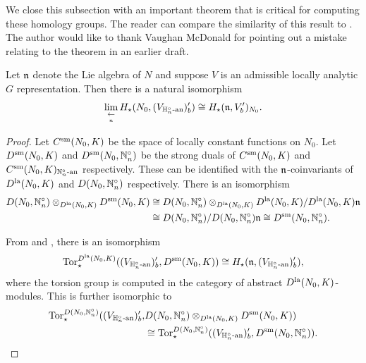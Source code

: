 \documentclass[10pt]{amsart}
\begin{document}
We close this subsection with an important theorem that is critical for computing these homology groups. The reader can compare the similarity of this result to \cite[Thm. 4.10, Thm. 7.1]{Kohlhaase}. The author would like to thank Vaughan McDonald for pointing out a mistake relating to the theorem in an earlier draft. 

\begin{theorem}\label{thm:lie_cohom}
Let $\mathfrak{n}$ denote the Lie algebra of $N$ and suppose $V$ is an admissible locally analytic $G$ representation. Then there is a natural isomorphism \begin{equation}
    \underset{\underset{n}{\leftarrow}}{\lim} \,H_{\star}(N_{0},(V_{\mathbb{H}_{n}^{\circ}\textnormal{-an}})^{\prime}_{b}) \cong H_{\star}(\mathfrak{n},V^\prime_{b})_{N_{0}}. 
\end{equation}
\end{theorem}
\begin{proof}
Let $C^{\textnormal{sm}}(N_{0},K)$ be the space of locally constant functions on $N_{0}$. Let $D^{\textnormal{sm}}(N_{0},K)$ and $D^{\textnormal{sm}}(N_{0},\mathbb{N}_{n}^{\circ})$ be the strong duals of $C^{\textnormal{sm}}(N_{0},K)$ and $C^{\textnormal{sm}}(N_{0},K)_{\mathbb{N}_{n}^{\circ}\textnormal{-an}}$ respectively. These can be identified with the $\mathfrak{n}$-coinvariants of $D^{\textnormal{la}}(N_{0},K)$ and $D(N_{0},\mathbb{N}_{n}^{\circ})$ respectively. There is an isomorphism \begin{equation*}\begin{split}
    D(N_{0},\mathbb{N}_{n}^{\circ})\otimes_{D^{\textnormal{la}}(N_{0},K)}D^{\textnormal{sm}}(N_{0},K) & \cong D(N_{0},\mathbb{N}_{n}^{\circ})\otimes_{D^{\textnormal{la}}(N_{0},K)}D^{\textnormal{la}}(N_{0},K) / D^{\textnormal{la}}(N_{0},K)\mathfrak{n} \\
    & \cong D(N_{0},\mathbb{N}_{n}^{\circ})/D(N_{0},\mathbb{N}_{n}^{\circ})\mathfrak{n} \cong D^{\textnormal{sm}}(N_{0},\mathbb{N}_{n}^{\circ}).
\end{split}
\end{equation*}

From \cite[(47)]{Kohlhaase} and \cite[pg. 306]{ST_duality}, there is an isomorphism \begin{equation}
    \textnormal{Tor}_{\star}^{D^{\textnormal{la}}(N_{0},K)}((V_{\mathbb{H}_{n}^{\circ}\textnormal{-an}})^{\prime}_{b}, D^{\textnormal{sm}}(N_{0},K)) \cong H_{\star}(\mathfrak{n},(V_{\mathbb{H}_{n}^{\circ}\textnormal{-an}})^{\prime}_{b}),
\end{equation} where the torsion group is computed in the category of abstract $D^{\textnormal{la}}(N_{0},K)$-modules. This is further isomorphic to \begin{equation}\label{eqn:tor}\begin{split}
    \textnormal{Tor}_{\star}^{D(N_{0},\mathbb{N}_{n}^{\circ})}((V_{\mathbb{H}_{n}^{\circ}\textnormal{-an}})^{\prime}_{b}, &  D(N_{0},\mathbb{N}_{n}^{\circ})\otimes_{D^{\textnormal{la}}(N_{0},K)}D^{\textnormal{sm}}(N_{0},K)) \\
    & \cong \textnormal{Tor}_{\star}^{D(N_{0},\mathbb{N}_{n}^{\circ})}((V_{\mathbb{H}_{n}^{\circ}\textnormal{-an}})^{\prime}_{b}, D^{\textnormal{sm}}(N_{0},\mathbb{N}_{n}^{\circ})).
\end{split}
\end{equation} 


\end{proof}
\end{document}
